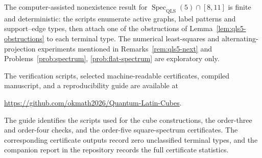 \documentclass[11pt]{amsart}
\theoremstyle{definition}
\newcommand{\QLS}{\mathrm{QLS}}
\begin{document}
The computer-assisted nonexistence result for
$\operatorname{Spec}_{\QLS}(5)\cap[8,11]$ is finite and deterministic:
the scripts enumerate active graphs, label patterns and support--edge
types, then attach one of the obstructions of
Lemma~\ref{lem:qls5-obstructions} to each terminal type.  The numerical
least-squares and alternating-projection experiments mentioned in
Remarks~\ref{rem:qls5-next} and Problems~\ref{prob:spectrum},
\ref{prob:flat-spectrum} are exploratory only.

The verification scripts, selected machine-readable certificates, compiled
manuscript, and a reproducibility guide are available at
\begin{center}
\url{https://github.com/okmath2026/Quantum-Latin-Cubes}.
\end{center}
The guide identifies the scripts used for the cube constructions, the
order-three and order-four checks, and the order-five square-spectrum
certificates.  The corresponding certificate outputs record zero
unclassified terminal types, and the companion report in the repository
records the full certificate statistics.
\end{document}
